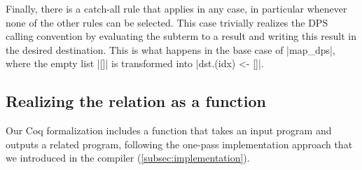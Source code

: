 Finally, there is a catch-all rule  that applies in any case, in particular whenever none of the other rules can be selected. This case trivially realizes the DPS calling convention by evaluating the subterm to a result and writing this result in the desired destination. This is what happens in the base case of \ocaml|map_dps|, where the empty list \ocaml|[]| is transformed into \ocaml|dst.(idx) <- []|.

% 


\subsection{Realizing the relation as a function}

Our Coq formalization includes a function that takes an input program and outputs a related program, following the one-pass implementation approach that we introduced in the \OCaml compiler (\cref{subsec:implementation}).

